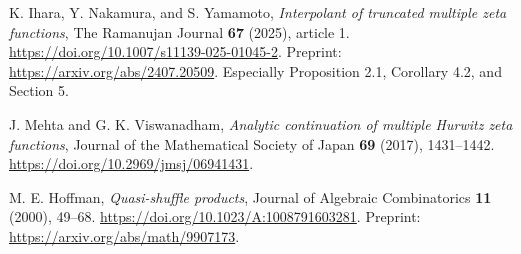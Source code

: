 K. Ihara, Y. Nakamura, and S. Yamamoto,
\emph{Interpolant of truncated multiple zeta functions},
The Ramanujan Journal \textbf{67} (2025), article 1.
\url{https://doi.org/10.1007/s11139-025-01045-2}.
Preprint: \url{https://arxiv.org/abs/2407.20509}.
Especially Proposition 2.1, Corollary 4.2, and Section 5.

J. Mehta and G. K. Viswanadham,
\emph{Analytic continuation of multiple Hurwitz zeta functions},
Journal of the Mathematical Society of Japan \textbf{69} (2017), 1431--1442.
\url{https://doi.org/10.2969/jmsj/06941431}.

M. E. Hoffman,
\emph{Quasi-shuffle products},
Journal of Algebraic Combinatorics \textbf{11} (2000), 49--68.
\url{https://doi.org/10.1023/A:1008791603281}.
Preprint: \url{https://arxiv.org/abs/math/9907173}.
